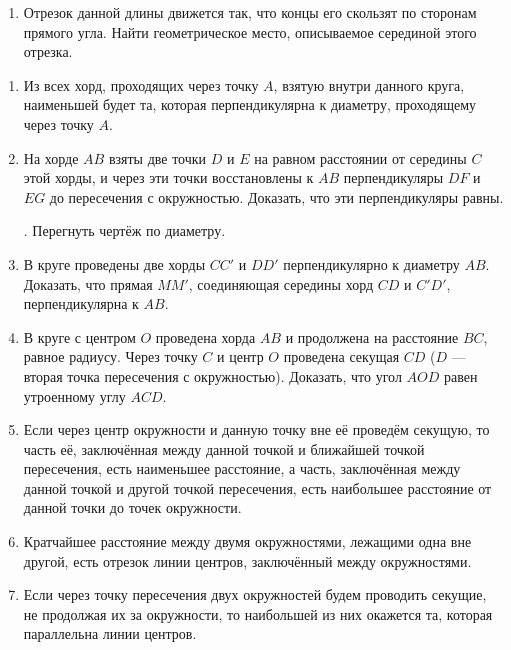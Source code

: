 {\begin{enumerate}[noitemsep]
\item
Отрезок данной длины движется так, что концы его скользят по сторонам прямого угла.
Найти геометрическое место, описываемое серединой этого отрезка.

\end{enumerate}

\begin{center}
\end{center}

\begin{enumerate}


\item
Из всех хорд, проходящих через точку $A$, взятую внутри данного круга, наименьшей будет та, которая перпендикулярна к диаметру, проходящему через точку $A$.

\item
На хорде $AB$ взяты две точки $D$ и $E$ на равном расстоянии от середины $C$ этой хорды, и через эти точки восстановлены к $AB$ перпендикуляры $DF$ и $EG$ до пересечения с окружностью.
Доказать, что эти перпендикуляры равны.

\smallskip
{}.
Перегнуть чертёж по диаметру.

\item
В круге проведены две хорды $CC'$ и $DD'$ перпендикулярно к диаметру $AB$.
Доказать, что прямая $MM'$, соединяющая середины хорд $CD$ и $C'D'$, перпендикулярна к $AB$.

\item
В круге с центром $O$ проведена хорда $AB$ и продолжена на расстояние $BC$, равное радиусу.
Через точку $C$ и центр $O$ проведена секущая $CD$ ($D$ — вторая точка пересечения с окружностью).
Доказать, что угол $AOD$ равен утроенному углу $ACD$.

\item
Если через центр окружности и данную точку вне её проведём секущую, то часть её, заключённая между данной точкой и ближайшей точкой пересечения, есть наименьшее расстояние, а часть, заключённая между данной точкой и другой точкой пересечения, есть наибольшее расстояние от данной точки до точек окружности.

\item
Кратчайшее расстояние между двумя окружностями, лежащими одна вне другой, есть отрезок линии центров, заключённый между окружностями.

\item
Если через точку пересечения двух окружностей будем проводить секущие, не продолжая их за окружности, то наибольшей из них окажется та, которая параллельна линии центров.


\end{enumerate}}
